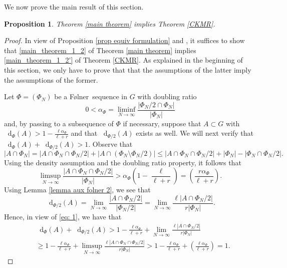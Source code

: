 \documentclass[reqno]{amsart}
\newcommand*\diff{\mathop{}\!\mathrm{d}}
\newtheorem{proposition}[theorem]{Proposition}
\theoremstyle{definition}
\theoremstyle{remark}
\theoremstyle{remark}
\newcommand{\Folner}{F\o{}lner}
\begin{document}
We now prove the main result of this section. 

\begin{proposition}\label{implication of main results}
Theorem \ref{main theorem} implies Theorem \ref{CKMR}.    
\end{proposition}

\begin{proof}
    In view of Proposition \ref{prop equiv formulation} and \cite[Proposition 2.3]{charamaras_kousek_mountakis_radic2025BBingroups}, it suffices to show that \eqref{main_theorem_1_2} of Theorem \ref{main theorem} implies \eqref{main_theorem_1_2'} of Theorem \ref{CKMR}. As explained in the beginning of this section, we only have to prove that that the assumptions of the latter imply the assumptions of the former. 

Let $\Phi=(\Phi_N)$ be a \Folner\ sequence in $G$ with doubling ratio 
$$0<\alpha_{\Phi}=\liminf_{N\to \infty} \frac{| \Phi_N/2 \cap \Phi_N|}{|\Phi_N|}$$
and, by passing to a subsequence of $\Phi$ if necessary, 
suppose that $A\subset G$ with $\diff_{\Phi}(A)>1-\frac{\ell \alpha_{\Phi}}{\ell+r}$ and that $\diff_{\Phi/2}(A)$ exists as well. We will next verify that $\diff_{\Phi}(A)+\diff_{\Phi/2}(A)>1$.
Observe that 
$$ \left| A \cap \Phi_N \right| =  \left| A \cap \Phi_N \cap \Phi_N/2 \right| + \left| A \cap \left(\Phi_N \setminus \Phi_N/2 \right) \right| \leq \left| A \cap \Phi_N \cap \Phi_N/2 \right| + \left| \Phi_N \right| - \left| \Phi_N \cap \Phi_N/2 \right|.$$
Using the density assumption and the doubling ratio property, it follows that 
\begin{equation}\label{eq: 1}
\limsup_{N\to \infty} \frac{\left| A \cap \Phi_N \cap \Phi_N/2 \right|}{\left| \Phi_N \right|} > \alpha_{\Phi}\left(1-\frac{\ell}{\ell+r}\right)= \left(\frac{r \alpha_{\Phi}}{\ell+r}\right).     
\end{equation}
Using Lemma \ref{lemma aux folner 2}, we see that 
$$\diff_{\Phi/2}(A)= \lim_{N\to \infty} \frac{\left| A\cap \Phi_N/2 \right|}{ \left| \Phi_N/2 \right|}=\lim_{N\to \infty} \frac{\ell \left| A\cap \Phi_N/2 \right|}{r \left| \Phi_N \right|}.$$
Hence, in view of \eqref{eq: 1}, we have that
\begin{align*}
& \diff_{\Phi}(A)+\diff_{\Phi/2}(A)> 1-\frac{\ell \alpha_{\Phi}}{\ell+r} + \lim_{N\to \infty} \frac{\ell \left| A\cap \Phi_N/2 \right|}{r \left| \Phi_N \right|} \\ & \geq  1-\frac{\ell \alpha_{\Phi}}{\ell+r} + \limsup_{N\to \infty} \frac{\ell \left| A\cap \Phi_N \cap \Phi_N/2 \right|}{r \left| \Phi_N \right|} > 1-\frac{\ell \alpha_{\Phi}}{\ell+r} + \left(\frac{\ell \alpha_{\Phi}}{\ell+r}\right)=1.
\end{align*}
\end{proof}
\end{document}

